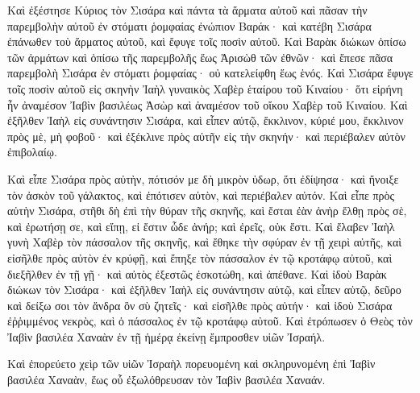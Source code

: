 {Καὶ ἐξέστησε Κύριος τὸν Σισάρα καὶ πάντα τὰ ἅρματα αὐτοῦ καὶ πᾶσαν τὴν παρεμβολὴν αὐτοῦ ἐν στόματι ῥομφαίας ἐνώπιον Βαράκ· καὶ κατέβη Σισάρα ἐπάνωθεν τοὺ ἄρματος αὐτοῦ, καὶ ἔφυγε τοῖς ποσὶν αὐτοῦ.
Καὶ Βαρὰκ διώκων ὀπίσω τῶν ἁρμάτων καὶ ὀπίσω τῆς παρεμβολῆς ἕως Ἀρισὼθ τῶν ἐθνῶν· καὶ ἔπεσε πᾶσα παρεμβολὴ Σισάρα ἐν στόματι ῥομφαίας· οὐ κατελείφθη ἕως ἑνός.
Καὶ Σισάρα ἔφυγε τοῖς ποσὶν αὐτοῦ εἰς σκηνὴν Ἰαὴλ γυναικὸς Χαβὲρ ἑταίρου τοῦ Κιναίου· ὅτι εἰρήνη ἦν ἀναμέσον Ἰαβὶν βασιλέως Ἀσὼρ καὶ ἀναμέσον τοῦ οἴκου Χαβὲρ τοῦ Κιναίου.
Καὶ ἐξῆλθεν Ἰαὴλ εἰς συνάντησιν Σισάρα, καὶ εἶπεν αὐτῷ, ἔκκλινον, κύριέ μου, ἔκκλινον πρὸς μὲ, μὴ φοβοῦ· καὶ ἐξέκλινε πρὸς αὐτῆν εἰς τὴν σκηνήν· καὶ περιέβαλεν αὐτὸν ἐπιβολαίῳ.
\par }{\PP {}Καὶ εἶπε Σισάρα πρὸς αὐτὴν, πότισόν με δὴ μικρὸν ὑδωρ, ὅτι ἐδίψησα· καὶ ἤνοιξε τὸν ἀσκὸν τοῦ γάλακτος, καὶ ἐπότισεν αὐτὸν, καὶ περιέβαλεν αὐτόν.
Καὶ εἶπε πρὸς αὐτὴν Σισάρα, στῆθι δὴ ἐπὶ τὴν θύραν τῆς σκηνῆς, καὶ ἔσται ἐὰν ἀνὴρ ἔλθῃ πρὸς σὲ, καὶ ἐρωτήσῃ σε, καὶ εἴπῃ, εἰ ἔστιν ὧδε ἀνήρ; καὶ ἐρεῖς, οὐκ ἔστι.
Καὶ ἔλαβεν Ἰαὴλ γυνὴ Χαβὲρ τὸν πάσσαλον τῆς σκηνῆς, καὶ ἔθηκε τὴν σφύραν ἐν τῇ χειρὶ αὐτῆς, καὶ εἰσῆλθε πρὸς αὐτὸν ἐν κρύφῇ, καὶ ἔπηξε τὸν πάσσαλον ἐν τῷ κροτάφῳ αὐτοῦ, καὶ διεξῆλθεν ἐν τῇ γῇ· καὶ αὐτὸς ἐξεστῶς ἐσκοτώθη, καὶ ἀπέθανε.
Καὶ ἰδοὺ Βαρὰκ διώκων τὸν Σισάρα· καὶ ἐξῆλθεν Ἰαὴλ εἰς συνάντησιν αὐτῷ, καὶ εἶπεν αὐτῷ, δεῦρο καὶ δείξω σοι τὸν ἄνδρα ὃν σὺ ζητεῖς· καὶ εἰσῆλθε πρὸς αὐτήν· καὶ ἰδοὺ Σισάρα ἐῤῥιμμένος νεκρὸς, καὶ ὁ πάσσαλος ἐν τῷ κροτάφῳ αὐτοῦ.
Καὶ ἐτρόπωσεν ὁ Θεὸς τὸν Ἰαβὶν βασιλέα Χαναὰν ἐν τῇ ἡμέρᾳ ἐκείνῃ ἔμπροσθεν υἱῶν Ἰσραήλ.
\par }{\PP {}Καὶ ἐπορεύετο χεὶρ τῶν υἱῶν Ἰσραὴλ πορευομένη καὶ σκληρυνομένη ἐπὶ Ἰαβὶν βασιλέα Χαναὰν, ἕως οὗ ἐξωλόθρευσαν τὸν Ἰαβὶν βασιλέα Χαναάν.

}
